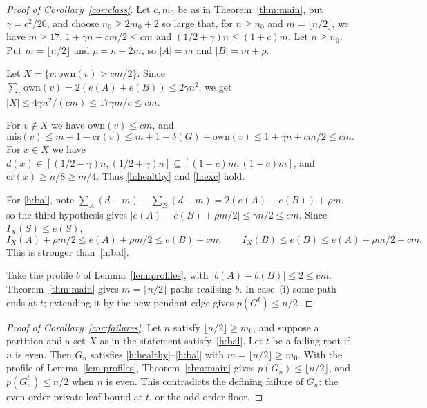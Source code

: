 \documentclass[11pt]{article}
\theoremstyle{definition}
\newcommand{\own}{\mathrm{own}}
\newcommand{\cro}{\mathrm{cr}}
\newcommand{\mis}{\mathrm{mis}}
\begin{document}
\begin{proof}[Proof of Corollary~\ref{cor:class}]
Let $c,m_0$ be as in Theorem~\ref{thm:main}, put $\gamma=c^2/20$, and choose $n_0\ge2m_0+2$ so large that, for $n\ge n_0$ and $m=\lfloor n/2\rfloor$, we have $m\ge17$, $1+\gamma n+cm/2\le cm$ and $(1/2+\gamma)n\le(1+c)m$. Let $n\ge n_0$. Put $m=\lfloor n/2\rfloor$ and $\rho=n-2m$, so $|A|=m$ and $|B|=m+\rho$.

Let $X=\{v:\own(v)>cm/2\}$. Since $\sum_v\own(v)=2(e(A)+e(B))\le2\gamma n^2$, we get $|X|\le4\gamma n^2/(cm)\le17\gamma m/c\le cm$.

For $v\notin X$ we have $\own(v)\le cm$, and
\[
\mis(v)\le m+1-\cro(v)\le m+1-\delta(G)+\own(v)\le1+\gamma n+cm/2\le cm.
\]
For $x\in X$ we have $d(x)\in[(1/2-\gamma)n,(1/2+\gamma)n]\subseteq[(1-c)m,(1+c)m]$, and $\cro(x)\ge n/8\ge m/4$. Thus \ref{h:healthy} and \ref{h:exc} hold.

For \ref{h:bal}, note $\sum_A(d-m)-\sum_B(d-m)=2(e(A)-e(B))+\rho m$, so the third hypothesis gives $|e(A)-e(B)+\rho m/2|\le\gamma n/2\le cm$. Since $I_X(S)\le e(S)$,
\[
I_X(A)+\rho m/2\le e(A)+\rho m/2\le e(B)+cm,\qquad I_X(B)\le e(B)\le e(A)+\rho m/2+cm.\]
This is stronger than~\ref{h:bal}.

Take the profile $b$ of Lemma~\ref{lem:profiles}, with $|b(A)-b(B)|\le2\le cm$. Theorem~\ref{thm:main} gives $m=\lfloor n/2\rfloor$ paths realising $b$. In case~(i) some path ends at $t$; extending it by the new pendant edge gives $p(G^t)\le n/2$.
\end{proof}

\begin{proof}[Proof of Corollary~\ref{cor:failures}]
Let $n$ satisfy $\lfloor n/2\rfloor\ge m_0$, and suppose a partition and a set $X$ as in the statement satisfy~\ref{h:bal}. Let $t$ be a failing root if $n$ is even. Then $G_n$ satisfies \ref{h:healthy}--\ref{h:bal} with $m=\lfloor n/2\rfloor\ge m_0$. With the profile of Lemma~\ref{lem:profiles}, Theorem~\ref{thm:main} gives $p(G_n)\le\lfloor n/2\rfloor$, and $p(G_n^t)\le n/2$ when $n$ is even. This contradicts the defining failure of $G_n$: the even-order private-leaf bound at $t$, or the odd-order floor.
\end{proof}
\end{document}
